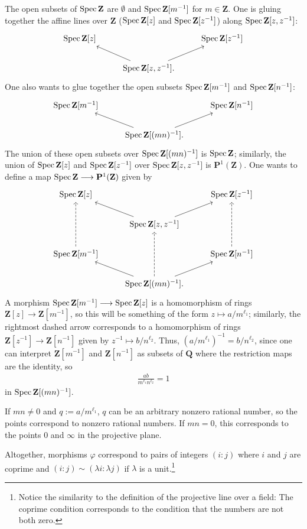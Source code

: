 \documentclass [11 pt, oneside] {article}
\begin{document}
\begin{example}[ ]
The open subsets of $\operatorname{Spec} \mathbf{Z}$ are $\emptyset$ and $\operatorname{Spec} \mathbf{Z}[m^{-1}]$ for $m\in \mathbf{Z}$. One is gluing together the affine lines over $\mathbf{Z}$ ($\operatorname{Spec} \mathbf{Z}[z]$ and $\operatorname{Spec} \mathbf{Z}[z^{-1}]$) along $\operatorname{Spec} \mathbf{Z}[z,z^{-1}]$:
\[
\begin{tikzcd}
	\Spec \mathbf{Z}[z] &&\Spec \mathbf{Z}[z^{-1}]\\
			    &\Spec \mathbf{Z}[z,z^{-1}]. \ar[ru]\ar[lu]
\end{tikzcd}
\]
One also wants to glue together the open subsets $\operatorname{Spec} \mathbf{Z}[m^{-1}]$ and $\operatorname{Spec} \mathbf{Z}[n^{-1}]$:
\[
\begin{tikzcd}
	\Spec \mathbf{Z}[m^{-1}] &&\Spec \mathbf{Z}[n^{-1}]\\
	&\Spec \mathbf{Z}[(mn)^{-1}]. \ar[ru]\ar[lu]
\end{tikzcd}
\]
The union of these open subsets over $\operatorname{Spec} \mathbf{Z}[(mn)^{-1}]$ is $\operatorname{Spec} \mathbf{Z}$; similarly, the union of $\operatorname{Spec} \mathbf{Z}[z]$ and $\operatorname{Spec} \mathbf{Z}[z^{-1}]$ over $\operatorname{Spec} \mathbf{Z}[z,z^{-1}]$ is $\mathbf{P}^1(\mathbf{Z})$. One wants to define a map $\operatorname{Spec} \mathbf{Z}\longrightarrow \mathbf{P}^1(\mathbf{Z})$ given by
\[
\begin{tikzcd}
	\Spec \mathbf{Z}[z] &&\Spec \mathbf{Z}[z^{-1}]\\
	&\Spec \mathbf{Z}[z,z^{-1}] \ar[ru]\ar[lu]\\
	\Spec \mathbf{Z}[m^{-1}]\ar[uu, dashed]  &&\Spec \mathbf{Z}[n^{-1}]\ar[uu, dashed]\\
	&\Spec \mathbf{Z}[(mn)^{-1}].\ar[uu, dashed] \ar[ru]\ar[lu]
\end{tikzcd}
\]
A morphism $\operatorname{Spec} \mathbf{Z}[m^{-1}]\longrightarrow \operatorname{Spec} \mathbf{Z}[z]$ is a homomorphism of rings $\mathbf{Z}[z]\longrightarrow \mathbf{Z}[m^{-1}]$, so this will be something of the form $z\longmapsto a/m^{\ell_1}$; similarly, the rightmost dashed arrow corresponds to a homomorphism of rings $\mathbf{Z}[z^{-1}] \longrightarrow \mathbf{Z}[n^{-1}]$ given by $z^{-1}\longmapsto b/n^{\ell_2}$. Thus, $(a/m^{\ell_1}) ^{-1}=b/n^{\ell_2}$, since one can interpret $\mathbf{Z}[m^{-1}]$ and $\mathbf{Z}[n^{-1}]$ as subsets of $\mathbf{Q}$ where the restriction maps are the identity, so
\begin{align*}
	\frac{ab}{m^{\ell_1}n^{\ell_2}}=1
\end{align*}
in $\operatorname{Spec} \mathbf{Z}[(mn) ^{-1}]$.

If $mn\ne 0$ and $q:= a/m^{\ell_1}$, $q$ can be an arbitrary nonzero rational number, so the points correspond to nonzero rational numbers. If $mn=0$, this corresponds to the points $0$ and $\infty$ in the projective plane.

Altogether, morphisms $\varphi$ correspond to pairs of integers $(i:j)$ where $i$ and $j$ are coprime and $(i:j)\sim  (\lambda i :\lambda j)$ if $\lambda$ is a unit.\footnote{Notice the similarity to the definition of the projective line over a field: The coprime condition corresponds to the condition that the numbers are not both zero.}
\end{example}
\end{document}
